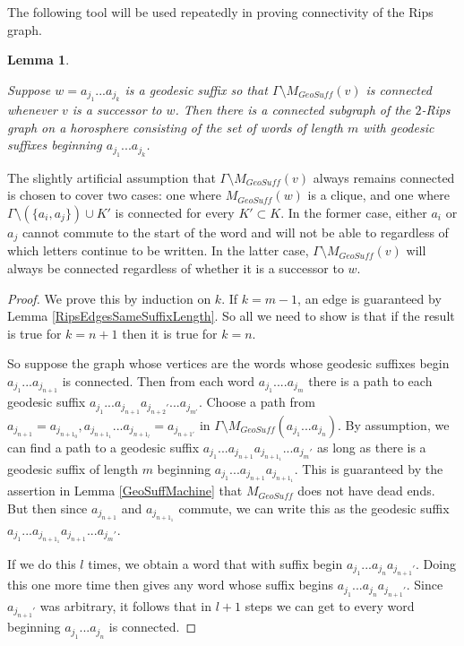 \documentclass{amsart}
\newtheorem{lemma}[theorem]{Lemma}
\theoremstyle{definition}
\theoremstyle{remark}
\begin{document}
	The following tool will be used repeatedly in proving connectivity of the Rips graph.
	
	\begin{lemma} \label{RipsGraphPartialConnectivity}
		
		Suppose $w=a_{j_1}...a_{j_k}$ is a geodesic suffix so that $\Gamma\setminus M_{GeoSuff}(v)$ is connected whenever $v$ is a successor to $w$. Then there is a connected subgraph of the $2$-Rips graph on a horosphere consisting of the set of words of length $m$ with geodesic suffixes beginning $a_{j_1}...a_{j_k}$.
		
	\end{lemma}
	
	The slightly artificial assumption that $\Gamma\setminus M_{GeoSuff}(v)$ always remains connected is chosen to cover two cases: one where $M_{GeoSuff}(w)$ is a clique, and one where $\Gamma\setminus (\{a_i, a_j\})\cup K'$ is connected for every $K'\subset K$. In the former case, either $a_i$ or $a_j$ cannot commute to the start of the word and will not be able to regardless of which letters continue to be written. In the latter case, $\Gamma\setminus M_{GeoSuff}(v)$ will always be connected regardless of whether it is a successor to $w$.
	
	\begin{proof}
		
		We prove this by induction on $k$. If $k=m-1$, an edge is guaranteed by Lemma \ref{RipsEdgesSameSuffixLength}. So all we need to show is that if the result is true for $k=n+1$ then it is true for $k=n$.
		
		So suppose the graph whose vertices are the words whose geodesic suffixes begin \newline $a_{j_1}...a_{j_{n+1}}$ is connected. Then from each word $a_{j_1}....a_{j_m}$ there is a path to each geodesic suffix $a_{j_1}...a_{j_{n+1}}a_{j_{n+2}'}...a_{j_{m'}}$. Choose a path from $a_{j_{n+1}}=a_{j_{n+1_0}},a_{j_{n+1_1}}...a_{j_{n+1_l}}=a_{j_{n+1'}}$ in \newline $\Gamma\setminus M_{GeoSuff}(a_{j_1}...a_{j_n})$. By assumption, we can find a path to a geodesic suffix \newline $a_{j_1}...a_{j_{n+1}}a_{j_{n+1_1}}...a_{j_m'}$ as long as there is a geodesic suffix of length $m$ beginning \newline $a_{j_1}...a_{j_{n+1}}a_{j_{n+1_1}}$. This is guaranteed by the assertion in Lemma \ref{GeoSuffMachine} that $M_{GeoSuff}$ does not have dead ends. But then since $a_{j_{n+1}}$ and $a_{j_{n+1_1}}$ commute, we can write this as the geodesic suffix $a_{j_1}...a_{j_{n+1_1}}a_{j_{n+1}}...a_{j_{m}'}$. 
		
		If we do this $l$ times, we obtain a word that with suffix begin $a_{j_1}...a_{j_n}a_{j_{n+1}'}$. Doing this one more time then gives any word whose suffix begins $a_{j_1}...a_{j_n}a_{j_{n+1}'}$. Since $a_{j_{n+1}'}$ was arbitrary, it follows that in $l+1$ steps we can get to every word beginning $a_{j_1}...a_{j_n}$ is connected.
	\end{proof}
	
\end{document}
